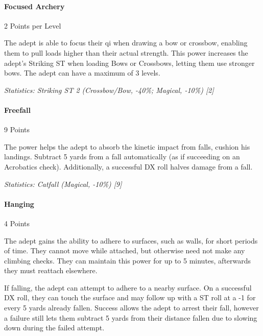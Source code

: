 \begin{multicols*}{3}
	\paragraph{Focused Archery}
	\begin{flushright}
		2 Points per Level
	\end{flushright}

	The adept is able to focus their qi when drawing a bow or crossbow, enabling them to pull loads higher than their actual strength. This power increases the adept's Striking ST when loading Bows or Crossbows, letting them use stronger bows. The adept can have a maximum of 3 levels.

	\textcolor{OliveGreen}{\textit{Statistics: Striking ST 2 (Crossbow/Bow, -40\%; Magical, -10\%) [2] }}

	\paragraph{Freefall}
	\begin{flushright}
		9 Points
	\end{flushright}

	The power helps the adept to absorb the kinetic impact from falls, cushion his landings. Subtract 5 yards from a fall automatically (as if succeeding on an Acrobatics check). Additionally, a successful DX roll halves damage from a fall.

	\textcolor{OliveGreen}{\textit{Statistics: Catfall (Magical, -10\%) [9]}}

	\paragraph{Hanging}
	\begin{flushright}
		4 Points
	\end{flushright}

	The adept gains the ability to adhere to surfaces, such as walls, for short periods of time. They cannot move while attached, but otherwise need not make any climbing checks. They can maintain this power for up to 5 minutes, afterwards they must reattach elsewhere.
	
	If falling, the adept can attempt to adhere to a nearby surface. On a successful DX roll, they can touch the surface and may follow up with a ST roll at a -1 for every 5 yards already fallen. Success allows the adept to arrest their fall, however a failure still lets them subtract 5 yards from their distance fallen due to slowing down during the failed attempt.
	

\end{multicols*}
